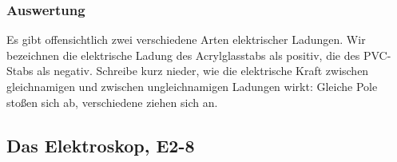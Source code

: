 \documentclass[a4paper]{report}
\begin{document}
\subsubsection{Auswertung} Es gibt offensichtlich zwei verschiedene Arten
elektrischer Ladungen. Wir bezeichnen die elektrische Ladung des Acrylglasstabs
als positiv, die des PVC-Stabs als negativ. Schreibe kurz nieder, wie die
elektrische Kraft zwischen gleichnamigen und zwischen ungleichnamigen Ladungen
wirkt: Gleiche Pole stoßen sich ab, verschiedene ziehen sich an.

\subsection{Das Elektroskop, E2-8} 
\end{document}
